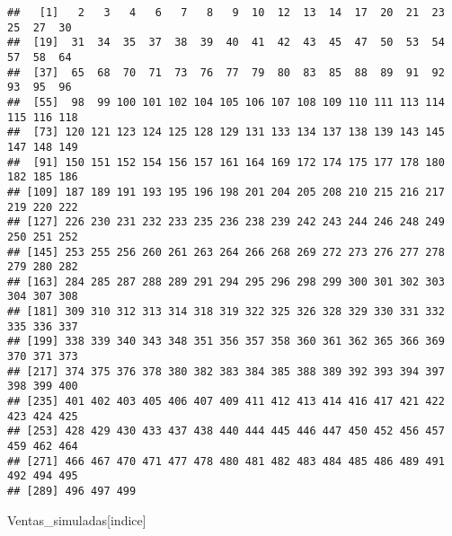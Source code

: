 \documentclass[
]{article}
\newenvironment{Shaded}{\begin{snugshade}}{\end{snugshade}}
\newcommand{\NormalTok}[1]{#1}
\begin{document}
\begin{verbatim}
##   [1]   2   3   4   6   7   8   9  10  12  13  14  17  20  21  23  25  27  30
##  [19]  31  34  35  37  38  39  40  41  42  43  45  47  50  53  54  57  58  64
##  [37]  65  68  70  71  73  76  77  79  80  83  85  88  89  91  92  93  95  96
##  [55]  98  99 100 101 102 104 105 106 107 108 109 110 111 113 114 115 116 118
##  [73] 120 121 123 124 125 128 129 131 133 134 137 138 139 143 145 147 148 149
##  [91] 150 151 152 154 156 157 161 164 169 172 174 175 177 178 180 182 185 186
## [109] 187 189 191 193 195 196 198 201 204 205 208 210 215 216 217 219 220 222
## [127] 226 230 231 232 233 235 236 238 239 242 243 244 246 248 249 250 251 252
## [145] 253 255 256 260 261 263 264 266 268 269 272 273 276 277 278 279 280 282
## [163] 284 285 287 288 289 291 294 295 296 298 299 300 301 302 303 304 307 308
## [181] 309 310 312 313 314 318 319 322 325 326 328 329 330 331 332 335 336 337
## [199] 338 339 340 343 348 351 356 357 358 360 361 362 365 366 369 370 371 373
## [217] 374 375 376 378 380 382 383 384 385 388 389 392 393 394 397 398 399 400
## [235] 401 402 403 405 406 407 409 411 412 413 414 416 417 421 422 423 424 425
## [253] 428 429 430 433 437 438 440 444 445 446 447 450 452 456 457 459 462 464
## [271] 466 467 470 471 477 478 480 481 482 483 484 485 486 489 491 492 494 495
## [289] 496 497 499
\end{verbatim}

\begin{Shaded}
\begin{Highlighting}[]
\NormalTok{Ventas\_simuladas[indice]}
\end{Highlighting}
\end{Shaded}
\end{document}
